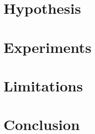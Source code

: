 \documentclass[10pt,twocolumn,letterpaper]{article}
\begin{document}


\section{Hypothesis}


\section{Experiments}


\section{Limitations}


\section{Conclusion}
\end{document}
